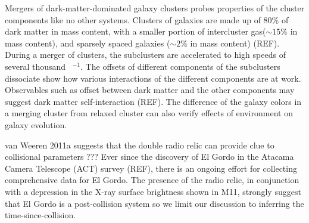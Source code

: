 

Mergers of dark-matter-dominated galaxy clusters probes properties
of the cluster components like no other systems. 
Clusters of galaxies are made up of 80\% of dark matter in mass content, 
with a smaller  portion of intercluster gas($\sim 15\%$ in mass content), and
sparsely spaced galaxies ($\sim 2\%$ in mass content) (REF). During a merger of
clusters, the subclusters are accelerated to high speeds of several
thousand \kilo \meter~\second$^{-1}$. The offsets of different components
of the subclusters dissociate show how various interactions of the different
components are at work. Observables such as offset between dark
matter and the other components may suggest dark matter self-interaction
(REF).  The difference of the galaxy colors in a merging cluster from relaxed cluster can also verify effects of environment on galaxy evolution.\par

van Weeren 2011a suggests that the double radio relic can provide clue to
collisional parameters ???
Ever since the discovery of El Gordo in the Atacama Camera Telescope (ACT)
survey (REF), there is an ongoing effort for collecting comprehensive data
for El Gordo.
The presence of the radio relic, in
conjunction with a depression in the X-ray surface brightness shown in M11,
strongly suggest that El Gordo is a post-collision system so we limit our
discussion to inferring the time-since-collision. 

